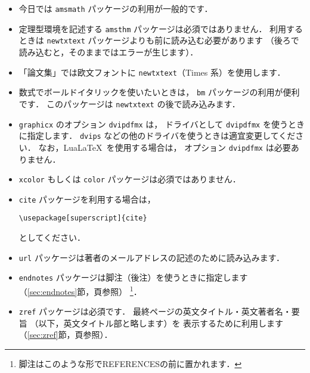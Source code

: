 \documentclass{jjsce}%
\begin{document}
\begin{itemize}
      \item
            今日では \texttt{amsmath} パッケージの利用が一般的です．
      \item
            定理型環境を記述する \texttt{amsthm} パッケージは必須ではありません．
            利用するときは
            \texttt{newtxtext} パッケージよりも前に読み込む必要があります
            （後ろで読み込むと，そのままではエラーが生じます）．
      \item
            「論文集」では欧文フォントに
            \texttt{newtxtext}（Times 系）を使用します．
      \item
            数式でボールドイタリックを使いたいときは，
            \texttt{bm} パッケージの利用が便利です．
            このパッケージは \texttt{newtxtext} の後で読み込みます．
      \item
            \verb/graphicx/ のオプション \texttt{dvipdfmx} は，
            ドライバとして \texttt{dvipdfmx} を使うときに指定します．
            \texttt{dvips} などの他のドライバを使うときは適宜変更してください．
            なお，Lua\LaTeX\ を使用する場合は，
            オプション \texttt{dvipdfmx} は必要ありません．
      \item
            \texttt{xcolor} もしくは \texttt{color} パッケージは必須ではありません．
      \item
            \texttt{cite} パッケージを利用する場合は，
            \begin{verbatim}
\usepackage[superscript]{cite}
\end{verbatim}
            としてください．


      \item
            \texttt{url} パッケージは著者のメールアドレスの記述のために読み込みます．
      \item
            \texttt{endnotes} パッケージは脚注（後注）を使うときに指定します
            （\ref{sec:endnotes}節，\pageref{sec:endnotes}頁参照）%
            \footnote{脚注はこのような形でREFERENCESの前に置かれます．}．
      \item
            \texttt{zref} パッケージは必須です．
            最終ページの英文タイトル・英文著者名・要旨
            （以下，英文タイトル部と略します）を
            表示するために利用します（\ref{sec:zref}節，\pageref{sec:zref}頁参照）．
\end{itemize}
\end{document}
